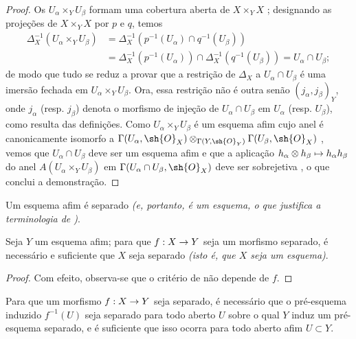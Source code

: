 \documentclass[oneside]{amsart}
\makeatletter
\newcommand{\ega@arrow}[2]{\mathchoice{#1}{#2}{#2}{#2}}
\let\ega@shortmapsto\mapsto
\renewcommand{\to}{\ega@arrow{\longrightarrow}{\rightarrow}}
\renewcommand{\mapsto}{\ega@arrow{\longmapsto}{\ega@shortmapsto}}
\let\EGAOriginalLabel\label
\renewcommand{\label}[1]{\phantomsection\EGAOriginalLabel{#1}}
\makeatother
\begin{document}
\begin{proof}
Os $U_\alpha\times_Y U_\beta$ formam uma cobertura aberta de $X\times_Y X$
; designando as projeções de $X\times_Y X$ por $p$ e $q$, temos
\begin{align*}
  \Delta_X^{-1}(U_\alpha\times_Y U_\beta)&=\Delta_X^{-1}(p^{-1}(U_\alpha)\cap q^{-1}(U_\beta))\\
                                         &=\Delta_X^{-1}(p^{-1}(U_\alpha))\cap\Delta_X^{-1}(q^{-1}(U_\beta))=U_\alpha\cap U_\beta;
\end{align*}
de modo que tudo se reduz a provar que a restrição de $\Delta_X$ a
$U_\alpha\cap U_\beta$ é uma imersão fechada em
$U_\alpha\times_Y U_\beta$.
Ora, essa restrição não é outra senão $(j_\alpha,j_\beta)_Y$, onde $j_\alpha$
(resp. $j_\beta$) denota o morfismo de injeção de
$U_\alpha\cap U_\beta$ em $U_\alpha$ (resp. $U_\beta$), como resulta das
definições.
Como $U_\alpha\times_Y U_\beta$ é um esquema afim cujo anel é canonicamente
isomorfo a
$\Gamma(U_\alpha,\sh{O}_X)\otimes_{\Gamma(Y,\sh{O}_Y)}\Gamma(U_\beta,\sh{O}_X)$
, vemos que $U_\alpha\cap U_\beta$ deve ser um esquema afim e
que a aplicação $h_\alpha\otimes h_\beta\mapsto h_\alpha h_\beta$ do anel
$A(U_\alpha\times_Y U_\beta)$ em
$\Gamma(U_\alpha\cap U_\beta,\sh{O}_X)$ deve ser sobrejetiva
, o que conclui a demonstração.
\end{proof}

\begin{corollary}[5.5.7]
\label{I.5.5.7}
Um esquema afim é separado \emph{(e, portanto, é um \emph{esquema}, o que
justifica a terminologia de )}.
\end{corollary}

\begin{corollary}[5.5.8]
\label{I.5.5.8}
Seja $Y$ um esquema afim; para que $f:X\to Y$ seja um morfismo separado, é
necessário e suficiente que $X$ seja separado \emph{(isto é, que $X$ seja um
\emph{esquema})}.
\end{corollary}

\begin{proof}
Com efeito, observa-se que o critério de  não depende de $f$.
\end{proof}

\begin{corollary}[5.5.9]
\label{I.5.5.9}
Para que um morfismo $f:X\to Y$ seja separado, é necessário que o pré-esquema
induzido $f^{-1}(U)$ seja separado para todo aberto $U$ sobre o qual $Y$ induz
um pré-esquema separado, e é suficiente que isso ocorra para todo aberto afim
$U\subset Y$.
\end{corollary}
\end{document}
